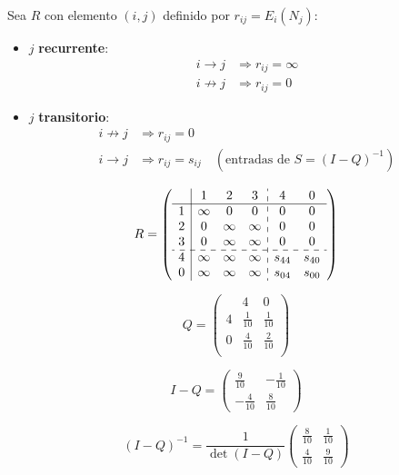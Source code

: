 Sea $R$ con elemento $(i,j)$ definido por $r_{ij} = E_i(N_j)$:

\begin{itemize}
    \item $j$ \textbf{recurrente}:
    \begin{align*}
        i \to j   &\Rightarrow r_{ij} = \infty \\
        i \not\to j &\Rightarrow r_{ij} = 0
    \end{align*}
    \item $j$ \textbf{transitorio}:
    \begin{align*}
        i \not\to j &\Rightarrow r_{ij} = 0 \\
        i \to j   &\Rightarrow r_{ij} = s_{ij} \quad (\text{entradas de } S = (I-Q)^{-1})
    \end{align*}
\end{itemize}

\[
R =
\left(
\begin{array}{c|ccc:cc}
    & 1 & 2 & 3 & 4 & 0 \\\hline
  1 & \infty & 0       & 0       & 0     & 0     \\
  2 & 0      & \infty  & \infty  & 0     & 0     \\
  3 & 0      & \infty  & \infty  & 0     & 0     \\
  \hdashline
  4 & \infty & \infty  & \infty  & s_{44} & s_{40} \\
  0 & \infty & \infty  & \infty  & s_{04} & s_{00} \\
\end{array}
\right)
\]

\[
Q =
\left(
\begin{array}{c|cc}
    & 4 & 0 \\\hline
  4 & \tfrac{1}{10} & \tfrac{1}{10} \\
  0 & \tfrac{4}{10} & \tfrac{2}{10} \\
\end{array}
\right)
\]

\[
I - Q =
\left(
\begin{array}{cc}
  \tfrac{9}{10}  & -\tfrac{1}{10} \\[4pt]
  -\tfrac{4}{10} &  \tfrac{8}{10}
\end{array}
\right)
\]

\[
(I-Q)^{-1} = \frac{1}{\det(I-Q)} \begin{pmatrix} \tfrac{8}{10} & \tfrac{1}{10} \\[4pt] \tfrac{4}{10} & \tfrac{9}{10} \end{pmatrix}
\]

